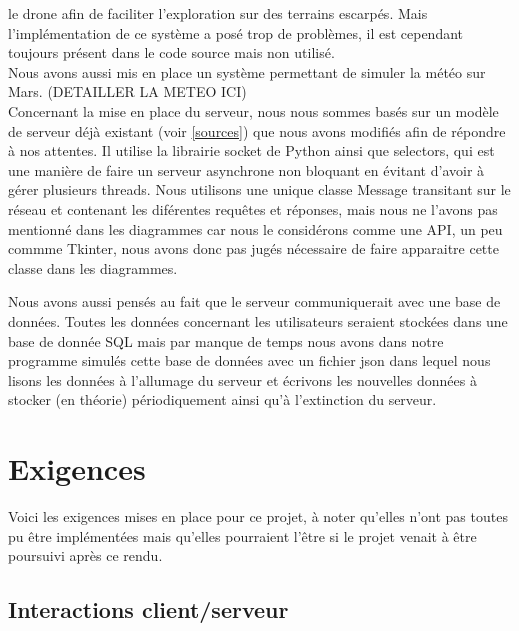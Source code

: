 \documentclass[12pt,a4paper]{scrartcl}
\begin{document}
le drone afin de faciliter l'exploration sur des terrains escarpés. Mais l'implémentation de ce système a posé trop de problèmes, il est cependant 
toujours présent dans le code source mais non utilisé.\\
Nous avons aussi mis en place un système permettant de simuler la météo sur Mars. (DETAILLER LA METEO ICI)
\\
Concernant la mise en place du serveur, nous nous sommes basés sur un modèle de serveur déjà existant (voir \ref{sources})
que nous avons modifiés afin de répondre à nos attentes. Il utilise la librairie socket de Python ainsi que selectors, qui est 
une manière de faire un serveur asynchrone non bloquant en évitant d'avoir à gérer plusieurs threads.
Nous utilisons une unique classe Message transitant sur le réseau et contenant les diférentes requêtes et réponses, mais nous
ne l'avons pas mentionné dans les diagrammes car nous le considérons comme une API, un peu commme Tkinter, nous avons donc pas jugés
nécessaire de faire apparaitre cette classe dans les diagrammes.

Nous avons aussi pensés au fait que le serveur communiquerait avec une base de données. Toutes les données concernant les utilisateurs seraient stockées dans une base de donnée SQL
mais par manque de temps nous avons dans notre programme simulés cette base de données avec un fichier json dans lequel nous lisons les données à l'allumage du serveur et écrivons les nouvelles
données à stocker (en théorie) périodiquement ainsi qu'à l'extinction du serveur.

\section{Exigences}
Voici les exigences mises en place pour ce projet, à noter qu'elles n'ont pas toutes pu être implémentées
mais qu'elles pourraient l'être si le projet venait à être poursuivi après ce rendu.

\subsection{Interactions client/serveur}
\end{document}
